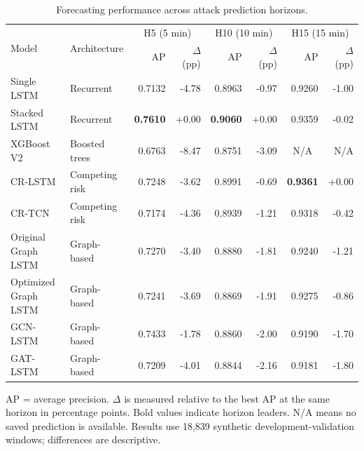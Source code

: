 \begin{table}[t]
\centering
\caption{Forecasting performance across attack prediction horizons.}
\label{tab:forecasting_benchmark}
\small
\begin{tabular}{llrrrrrr}
\toprule
\multirow{2}{*}{Model} & \multirow{2}{*}{Architecture} & \multicolumn{2}{c}{H5 (5 min)} & \multicolumn{2}{c}{H10 (10 min)} & \multicolumn{2}{c}{H15 (15 min)} \\
\cmidrule(lr){3-4}\cmidrule(lr){5-6}\cmidrule(lr){7-8}
 & & AP & $\Delta$ (pp) & AP & $\Delta$ (pp) & AP & $\Delta$ (pp) \\
\midrule
Single LSTM & Recurrent & 0.7132 & -4.78 & 0.8963 & -0.97 & 0.9260 & -1.00 \\
Stacked LSTM & Recurrent & \textbf{0.7610} & +0.00 & \textbf{0.9060} & +0.00 & 0.9359 & -0.02 \\
XGBoost V2 & Boosted trees & 0.6763 & -8.47 & 0.8751 & -3.09 & \multicolumn{1}{c}{N/A} & N/A \\
\midrule
CR-LSTM & Competing risk & 0.7248 & -3.62 & 0.8991 & -0.69 & \textbf{0.9361} & +0.00 \\
CR-TCN & Competing risk & 0.7174 & -4.36 & 0.8939 & -1.21 & 0.9318 & -0.42 \\
\midrule
Original Graph LSTM & Graph-based & 0.7270 & -3.40 & 0.8880 & -1.81 & 0.9240 & -1.21 \\
Optimized Graph LSTM & Graph-based & 0.7241 & -3.69 & 0.8869 & -1.91 & 0.9275 & -0.86 \\
GCN-LSTM & Graph-based & 0.7433 & -1.78 & 0.8860 & -2.00 & 0.9190 & -1.70 \\
GAT-LSTM & Graph-based & 0.7209 & -4.01 & 0.8844 & -2.16 & 0.9181 & -1.80 \\
\bottomrule
\end{tabular}
\vspace{2pt}
\parbox{\textwidth}{\footnotesize AP = average precision. $\Delta$ is measured relative to the best AP at the same horizon in percentage points. Bold values indicate horizon leaders. N/A means no saved prediction is available. Results use 18,839 synthetic development-validation windows; differences are descriptive.}
\end{table}
